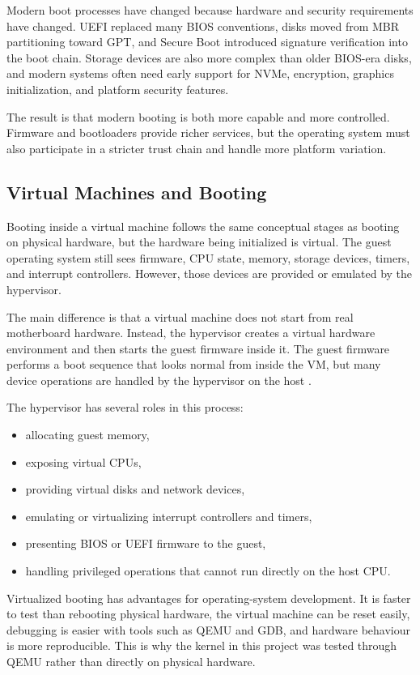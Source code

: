 Modern boot processes have changed because hardware and security requirements have changed. UEFI replaced many BIOS conventions, disks moved from MBR partitioning toward GPT, and Secure Boot introduced signature verification into the boot chain. Storage devices are also more complex than older BIOS-era disks, and modern systems often need early support for NVMe, encryption, graphics initialization, and platform security features.

The result is that modern booting is both more capable and more controlled. Firmware and bootloaders provide richer services, but the operating system must also participate in a stricter trust chain and handle more platform variation.

\subsection{Virtual Machines and Booting}
Booting inside a virtual machine follows the same conceptual stages as booting on physical hardware, but the hardware being initialized is virtual. The guest operating system still sees firmware, CPU state, memory, storage devices, timers, and interrupt controllers. However, those devices are provided or emulated by the hypervisor\cite{qemuPcMachine}.

The main difference is that a virtual machine does not start from real motherboard hardware. Instead, the hypervisor creates a virtual hardware environment and then starts the guest firmware inside it. The guest firmware performs a boot sequence that looks normal from inside the VM, but many device operations are handled by the hypervisor on the host \cite{hashnodeVMboot}.

The hypervisor has several roles in this process:
\begin{itemize}
  \item allocating guest memory,
  \item exposing virtual CPUs,
  \item providing virtual disks and network devices,
  \item emulating or virtualizing interrupt controllers and timers,
  \item presenting BIOS or UEFI firmware to the guest,
  \item handling privileged operations that cannot run directly on the host CPU.
\end{itemize}

Virtualized booting has advantages for operating-system development. It is faster to test than rebooting physical hardware, the virtual machine can be reset easily, debugging is easier with tools such as QEMU and GDB, and hardware behaviour is more reproducible. This is why the kernel in this project was tested through QEMU rather than directly on physical hardware.

